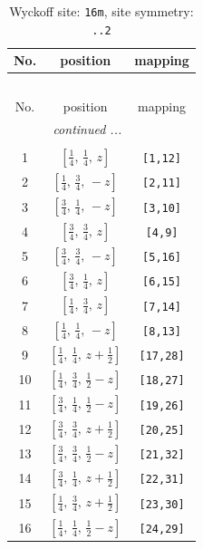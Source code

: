 \documentclass[fleqn,8pt]{jsarticle}
\begin{document}
\begin{longtable}{ccc}
\caption{Wyckoff site: {\tt 16m}, site symmetry: {\tt ..2}}
 \\
 \hline \hline
No. & position & mapping \\ \hline \endfirsthead

\multicolumn{2}{l}{\tablename\ \thetable{}} \\
 \hline \hline
No. & position & mapping \\ \hline \endhead

 \hline \hline
\multicolumn{2}{r}{\footnotesize\it continued ...} \\ \endfoot

 \hline \hline
\multicolumn{2}{r}{} \\ \endlastfoot

1 & $\left[ \frac{1}{4},\, \frac{1}{4},\, z \right]$ & {\tt [1,12]} \\ \hline
2 & $\left[ \frac{1}{4},\, \frac{3}{4},\, - z \right]$ & {\tt [2,11]} \\ \hline
3 & $\left[ \frac{3}{4},\, \frac{1}{4},\, - z \right]$ & {\tt [3,10]} \\ \hline
4 & $\left[ \frac{3}{4},\, \frac{3}{4},\, z \right]$ & {\tt [4,9]} \\ \hline
5 & $\left[ \frac{3}{4},\, \frac{3}{4},\, - z \right]$ & {\tt [5,16]} \\ \hline
6 & $\left[ \frac{3}{4},\, \frac{1}{4},\, z \right]$ & {\tt [6,15]} \\ \hline
7 & $\left[ \frac{1}{4},\, \frac{3}{4},\, z \right]$ & {\tt [7,14]} \\ \hline
8 & $\left[ \frac{1}{4},\, \frac{1}{4},\, - z \right]$ & {\tt [8,13]} \\ \hline
9 & $\left[ \frac{1}{4},\, \frac{1}{4},\, z + \frac{1}{2} \right]$ & {\tt [17,28]} \\ \hline
10 & $\left[ \frac{1}{4},\, \frac{3}{4},\, \frac{1}{2} - z \right]$ & {\tt [18,27]} \\ \hline
11 & $\left[ \frac{3}{4},\, \frac{1}{4},\, \frac{1}{2} - z \right]$ & {\tt [19,26]} \\ \hline
12 & $\left[ \frac{3}{4},\, \frac{3}{4},\, z + \frac{1}{2} \right]$ & {\tt [20,25]} \\ \hline
13 & $\left[ \frac{3}{4},\, \frac{3}{4},\, \frac{1}{2} - z \right]$ & {\tt [21,32]} \\ \hline
14 & $\left[ \frac{3}{4},\, \frac{1}{4},\, z + \frac{1}{2} \right]$ & {\tt [22,31]} \\ \hline
15 & $\left[ \frac{1}{4},\, \frac{3}{4},\, z + \frac{1}{2} \right]$ & {\tt [23,30]} \\ \hline
16 & $\left[ \frac{1}{4},\, \frac{1}{4},\, \frac{1}{2} - z \right]$ & {\tt [24,29]} \\
\end{longtable}
\end{document}
